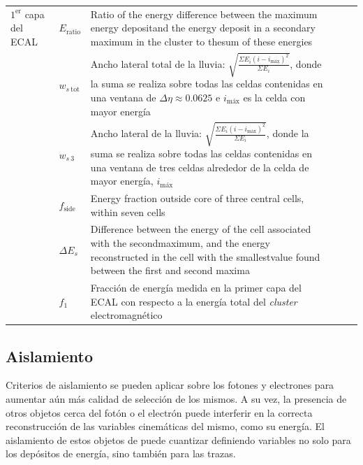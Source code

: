 \begin{table}
\begin{tabular}{ l p{2cm} p{8cm} c c c}
		\hline

		$1^{\text{er}}$ capa del ECAL & $E_{\text{ratio}}$ & Ratio of the energy difference between the maximum energy depositand the energy deposit in a secondary maximum in the cluster to thesum of these energies & \xmark & \cmark & \cmark \\

		 & $w_{s\:\text{tot}}$ & Ancho lateral total de la lluvia: $\sqrt{\frac{\Sigma E_{i}(i-i_{\text{máx}})^{2}}{\Sigma E_{i}}}$, donde la suma se realiza sobre todas las celdas contenidas en una ventana de $\Delta\eta\approx0.0625$ e $i_{\text{máx}}$ es la celda con mayor energía \tosolve{alto de la ventana?} & \xmark & \xmark & \cmark \\

		 & $w_{s\:\text{3}}$ & Ancho lateral de la lluvia: $\sqrt{\frac{\Sigma E_{i}(i-i_{\text{máx}})^{2}}{\Sigma E_{i}}}$, donde la suma se realiza sobre todas las celdas contenidas en una ventana de tres celdas alrededor de la celda de mayor energía, $i_{\text{máx}}$ & \xmark & \xmark & \cmark \\

		 & $f_{\text{side}}$ & Energy fraction outside core of three central cells, within seven cells \tosolve{entender y traducir bien} & \xmark & \xmark & \cmark \\

		 & $\Delta E_{s}$ & Difference between the energy of the cell associated with the secondmaximum, and the energy reconstructed in the cell with the smallestvalue found between the first and second maxima & \xmark & \xmark & \cmark \\

		 & $f_{\text{1}}$ & Fracción de energía medida en la primer capa del ECAL con respecto a la energía total del \textit{cluster} electromagnético & \xmark & \xmark & \cmark \\




	\end{tabular}
\label{phIDVars}
\end{table}




\subsection{Aislamiento}


Criterios de aislamiento se pueden aplicar sobre los fotones y electrones para aumentar aún más calidad de selección de los mismos. A su vez, la presencia de otros objetos cerca del fotón o el electrón puede interferir en la correcta reconstrucción de las variables cinemáticas del mismo, como su energía. El aislamiento de estos objetos de puede cuantizar definiendo variables no solo para los depósitos de energía, sino también para las trazas.

